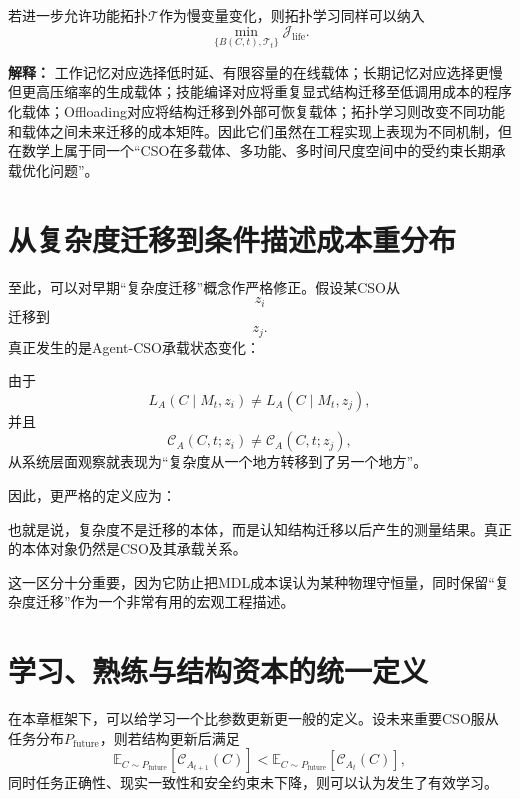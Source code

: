 若进一步允许功能拓扑$\mathcal T$作为慢变量变化，则拓扑学习同样可以纳入
\[
\boxed{
\min_{\{B(C,t),\mathcal T_t\}}
\mathcal J_{\mathrm{life}}.
}
\]

\textbf{解释：}
工作记忆对应选择低时延、有限容量的在线载体；长期记忆对应选择更慢但更高压缩率的生成载体；技能编译对应将重复显式结构迁移至低调用成本的程序化载体；Offloading对应将结构迁移到外部可恢复载体；拓扑学习则改变不同功能和载体之间未来迁移的成本矩阵。因此它们虽然在工程实现上表现为不同机制，但在数学上属于同一个“CSO在多载体、多功能、多时间尺度空间中的受约束长期承载优化问题”。

\section{从复杂度迁移到条件描述成本重分布}

至此，可以对早期“复杂度迁移”概念作严格修正。假设某CSO从
\[
z_i
\]
迁移到
\[
z_j.
\]
真正发生的是Agent-CSO承载状态变化：
\begin{statementbox}
\centering
{}
\end{statementbox}

由于
\[
L_A(C\mid M_t,z_i)
\neq
L_A(C\mid M_t,z_j),
\]
并且
\[
\mathscr C_A(C,t;z_i)
\neq
\mathscr C_A(C,t;z_j),
\]
从系统层面观察就表现为“复杂度从一个地方转移到了另一个地方”。

因此，更严格的定义应为：
\begin{statementbox}
\centering
{}
\end{statementbox}

也就是说，复杂度不是迁移的本体，而是认知结构迁移以后产生的测量结果。真正的本体对象仍然是CSO及其承载关系。

这一区分十分重要，因为它防止把MDL成本误认为某种物理守恒量，同时保留“复杂度迁移”作为一个非常有用的宏观工程描述。

\section{学习、熟练与结构资本的统一定义}

在本章框架下，可以给学习一个比参数更新更一般的定义。设未来重要CSO服从任务分布$P_{\mathrm{future}}$，则若结构更新后满足
\[
\boxed{
\mathbb E_{C\sim P_{\mathrm{future}}}
[
\mathscr C_{A_{t+1}}(C)
]
<
\mathbb E_{C\sim P_{\mathrm{future}}}
[
\mathscr C_{A_t}(C)
],
}
\]
同时任务正确性、现实一致性和安全约束未下降，则可以认为发生了有效学习。

